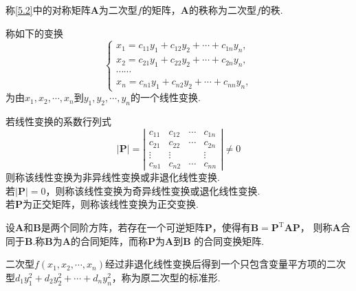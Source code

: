 \begin{definition}[二次型的矩阵]
    称\eqref{5.2}中的对称矩阵$\boldsymbol{A}$为{\heiti 二次型$f$的矩阵}，$\boldsymbol{A}$的秩称为{\heiti 二次型$f$的秩}.
\end{definition}

\begin{definition}
    称如下的变换
    $$\left\{\begin{array}{l}
            x_1=c_{11}y_1+c_{12}y_2+\cdots+c_{1n}y_n,\\
            x_2=c_{21}y_1+c_{22}y_2+\cdots+c_{2n}y_n,\\
            \cdots\cdots\\
            x_n=c_{n1}y_1+c_{n2}y_2+\cdots+c_{nn}y_n,
        \end{array}\right.$$
    为由$x_1,x_2,\cdots,x_n$到$y_1,y_2,\cdots,y_n$的一个{\heiti 线性变换}.

    若线性变换的系数行列式
    $$|\boldsymbol{P}|=\left|\begin{array}{cccc}
        c_{11} & c_{12} & \cdots & c_{1n}\\
        c_{21} & c_{22} & \cdots & c_{2n}\\
        \vdots & \vdots &  &\vdots\\
        c_{n1} & c_{n2} & \cdots & c_{nn}
    \end{array}\right|\neq 0$$
    则称该线性变换为{\heiti 非异线性变换}或{\heiti 非退化线性变换}.\\
    若$|\boldsymbol{P}|=0$，则称该线性变换为{\heiti 奇异线性变换}或{\heiti 退化线性变换}.\\
    若$\boldsymbol{P}$为正交矩阵，则称该线性变换为{\heiti 正交变换}.
\end{definition}

\begin{definition}[合同、合同变换]
    设$\boldsymbol{A}$和$\boldsymbol{B}$是两个同阶方阵，若存在一个可逆矩阵$\boldsymbol{P}$，使得有$\boldsymbol{B}=\boldsymbol{P}^\mathrm{T}\boldsymbol{A}\boldsymbol{P}$，
    则称$\boldsymbol{A}${\heiti 合同}于$\boldsymbol{B}$.称$\boldsymbol{B}$为$\boldsymbol{A}$的{\heiti 合同矩阵}，而称$\boldsymbol{P}$为$\boldsymbol{A}$到$\boldsymbol{B}$
    的{\heiti 合同变换矩阵}.
\end{definition}

\begin{definition}[二次型的标准形]
    二次型$f(x_1,x_2,\cdots,x_n)$经过非退化线性变换后得到一个只包含变量平方项的二次型$d_1y_1^2+d_2y_2^2+\cdots+d_ny_n^2$，称为原二次型的{\heiti 标准形}.
\end{definition}

